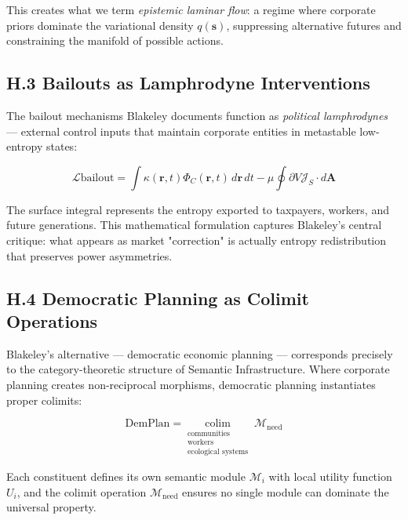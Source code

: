 \documentclass[11pt,a4paper,titlepage]{article}
\theoremstyle{definition}
\begin{document}
\begin{itemize}
This creates what we term \emph{epistemic laminar flow}: a regime where corporate priors dominate the variational density $q(\mathbf{s})$, suppressing alternative futures and constraining the manifold of possible actions.

\subsection*{H.3 Bailouts as Lamphrodyne Interventions}

The bailout mechanisms Blakeley documents function as \emph{political lamphrodynes} — external control inputs that maintain corporate entities in metastable low-entropy states:

\begin{equation}
\mathcal{L}{\text{bailout}} = \int \kappa(\mathbf{r},t) \Phi_C(\mathbf{r},t) \, d\mathbf{r} \, dt - \mu \oint{\partial V}\mathcal{J}_S \cdot d\mathbf{A}
\label{eq:bailout_operator}
\end{equation}

The surface integral represents the entropy exported to taxpayers, workers, and future generations. This mathematical formulation captures Blakeley's central critique: what appears as market "correction" is actually entropy redistribution that preserves power asymmetries.

\subsection*{H.4 Democratic Planning as Colimit Operations}

Blakeley's alternative — democratic economic planning — corresponds precisely to the category-theoretic structure of Semantic Infrastructure. Where corporate planning creates non-reciprocal morphisms, democratic planning instantiates proper colimits:

\begin{equation}
\text{DemPlan}= \underset{\substack{\text{communities} \\ \text{workers} \\ \text{ecological systems}}}{\text{colim}} \; \mathcal{M}_{\text{need}}
\label{eq:democratic_colimit}
\end{equation}

Each constituent defines its own semantic module $\mathcal{M}_i$ with local utility function $U_i$, and the colimit operation $\mathcal{M}_{\text{need}}$ ensures no single module can dominate the universal property.


\end{itemize}
\end{document}
